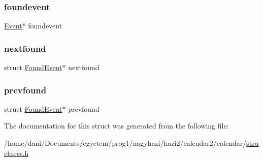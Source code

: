 \subsubsection{\texorpdfstring{foundevent}{foundevent}}
{\footnotesize\ttfamily \hyperlink{struct_event}{Event}$\ast$ foundevent}

\mbox{\label{struct_found_event_acbce65ffd090e8c5d45aa15b2ccdf453}} 
\subsubsection{\texorpdfstring{nextfound}{nextfound}}
{\footnotesize\ttfamily struct \hyperlink{struct_found_event}{Found\+Event}$\ast$ nextfound}

\mbox{\label{struct_found_event_add29159b298db5eb8c68bd9314e7c498}} 
\subsubsection{\texorpdfstring{prevfound}{prevfound}}
{\footnotesize\ttfamily struct \hyperlink{struct_found_event}{Found\+Event}$\ast$ prevfound}



The documentation for this struct was generated from the following file\+:\begin{DoxyCompactItemize}
\item 
/home/dani/\+Documents/egyetem/prog1/nagyhazi/hazi2/calendar2/calendar/\hyperlink{structures_8h}{structures.\+h}\end{DoxyCompactItemize}
